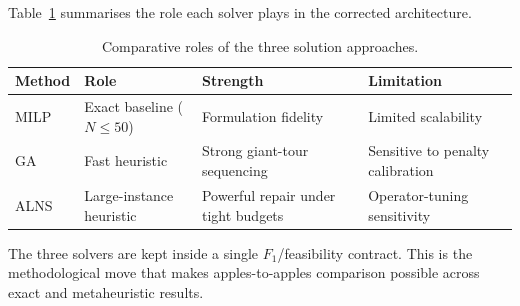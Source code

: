 Table~\ref{tab:solver_comparison} summarises the role each solver
plays in the corrected architecture.

\begin{table}[ht]
\centering
\caption{Comparative roles of the three solution approaches.}
\label{tab:solver_comparison}
\small
\begin{tabular}{llll}
\toprule
\textbf{Method} & \textbf{Role} & \textbf{Strength} & \textbf{Limitation} \\
\midrule
MILP & Exact baseline ($N \leq 50$) & Formulation fidelity & Limited scalability \\
GA   & Fast heuristic     & Strong giant-tour sequencing & Sensitive to penalty calibration \\
ALNS & Large-instance heuristic & Powerful repair under tight budgets & Operator-tuning sensitivity \\
\bottomrule
\end{tabular}
\end{table}

The three solvers are kept inside a single $F_1$/feasibility contract.
This is the methodological move that makes apples-to-apples
comparison possible across exact and metaheuristic results.
